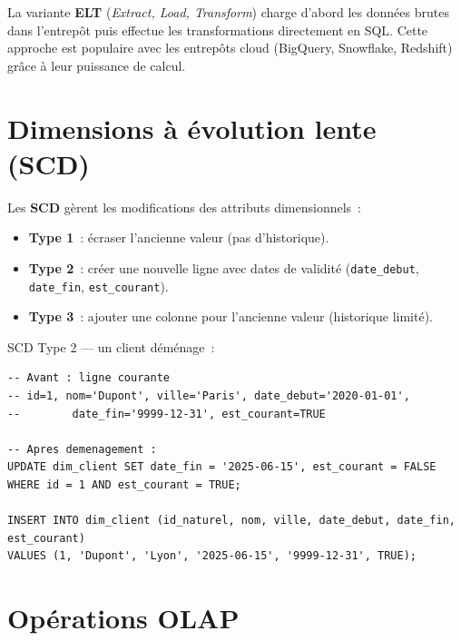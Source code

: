 \begin{definition}[ELT]
La variante \textbf{ELT} (\emph{Extract, Load, Transform}) charge d'abord
les donn\'ees brutes dans l'entrep\^ot puis effectue les transformations
directement en SQL. Cette approche est populaire avec les entrep\^ots cloud
(BigQuery, Snowflake, Redshift) gr\^ace \`a leur puissance de calcul.
\end{definition}

\section{Dimensions \`a \'evolution lente (SCD)}

\begin{definition}
Les \textbf{SCD} g\`erent les modifications des attributs dimensionnels~:
\begin{itemize}
  \item \textbf{Type 1}~: \'ecraser l'ancienne valeur (pas d'historique).
  \item \textbf{Type 2}~: cr\'eer une nouvelle ligne avec dates de validit\'e
        (\texttt{date\_debut}, \texttt{date\_fin}, \texttt{est\_courant}).
  \item \textbf{Type 3}~: ajouter une colonne pour l'ancienne valeur
        (historique limit\'e).
\end{itemize}
\end{definition}

\begin{exemple}
SCD Type 2 --- un client d\'em\'enage~:
\begin{verbatim}
-- Avant : ligne courante
-- id=1, nom='Dupont', ville='Paris', date_debut='2020-01-01',
--        date_fin='9999-12-31', est_courant=TRUE

-- Apres demenagement :
UPDATE dim_client SET date_fin = '2025-06-15', est_courant = FALSE
WHERE id = 1 AND est_courant = TRUE;

INSERT INTO dim_client (id_naturel, nom, ville, date_debut, date_fin, est_courant)
VALUES (1, 'Dupont', 'Lyon', '2025-06-15', '9999-12-31', TRUE);
\end{verbatim}
\end{exemple}

\section{Op\'erations OLAP}

